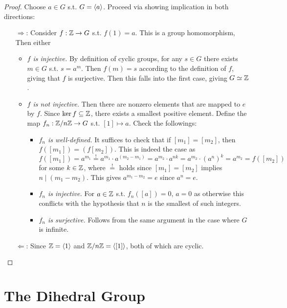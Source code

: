 \documentclass{article}
\begin{document}
\begin{proof}
    Choose $a \in G$ s.t. $G = \left\langle a \right\rangle$. Proceed via showing implication in both directions:
    \begin{enumerate}
        \item[$\Rightarrow$:] Consider $f: \mathbb{Z} \to G$ s.t. $f(1) = a$. This is a group homomorphism,  Then either
        \begin{itemize}
            \item \emph{$f$ is injective.} By definition of cyclic groups, for any $s \in G$ there exists $m \in G$ s.t. $s = a^m$. Then $f(m) = s$ according to the definition of $f$, giving that $f$ is surjective. Then this falls into the first case, giving $G \simeq \mathbb{Z}$.
            \item \emph{$f$ is not injective.} Then there are nonzero elements that are mapped to $e$ by $f$. Since $\ker f \subseteq \mathbb{Z}$, there exists a smallest positive element. Define the map $f_n: \mathbb{Z}/n\mathbb{Z} \to G$ s.t. $[1] \mapsto a$. Check the followings:
            \begin{itemize}
                \item \emph{$f_n$ is well-defined.} It suffices to check that if $[m_1] = [m_2]$, then $f([m_1]) = (f[m_2])$. This is indeed the case as
                \[
                    f([m_1]) = a^{m_1} \overset{!}{=} a^{m_1} \cdot a^{(m_2 - m_1)} = a^{m_2} \cdot a^{nk} = a^{m_2} \cdot (a^n)^k = a^{m_2} = f([m_2])
                \]
                for some $k \in \mathbb{Z}$, where $\overset{!}{=}$ holds since $[m_1] = [m_2]$ implies $n \mid (m_1 - m_2)$. This gives $a^{m_1 - m_2} = e$ since $a^n = e$. 
                \item \emph{$f_n$ is injective.} For $a \in \mathbb{Z}$ s.t. $f_n([a]) = 0$, $a = 0$ as otherwise this conflicts with the hypothesis that $n$ is the smallest of such integers. 
                \item \emph{$f_n$ is surjective.} Follows from the same argument in the case where $G$ is infinite.
            \end{itemize}
        \end{itemize}
        \item[$\Leftarrow$:] Since $\mathbb{Z} = \left\langle 1 \right\rangle$ and $\mathbb{Z}/n\mathbb{Z} = \left\langle [1] \right\rangle$, both of which are cyclic. 
    \end{enumerate}
\end{proof}

\section{The Dihedral Group}
\end{document}
